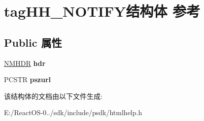 \hypertarget{structtag_h_h___n_o_t_i_f_y}{}\section{tag\+H\+H\+\_\+\+N\+O\+T\+I\+F\+Y结构体 参考}
\label{structtag_h_h___n_o_t_i_f_y}
\subsection*{Public 属性}
\begin{DoxyCompactItemize}
\item 
\mbox{\label{structtag_h_h___n_o_t_i_f_y_a68dc8577a5e246ab85a34da155da6940}} 
\hyperlink{structtag_n_m_h_d_r}{N\+M\+H\+DR} {\bfseries hdr}
\item 
\mbox{\label{structtag_h_h___n_o_t_i_f_y_a8d92befab6ae1a2aa2cef2f78beaccfc}} 
P\+C\+S\+TR {\bfseries pszurl}
\end{DoxyCompactItemize}


该结构体的文档由以下文件生成\+:\begin{DoxyCompactItemize}
\item 
E\+:/\+React\+O\+S-\/0../sdk/include/psdk/htmlhelp.\+h\end{DoxyCompactItemize}
